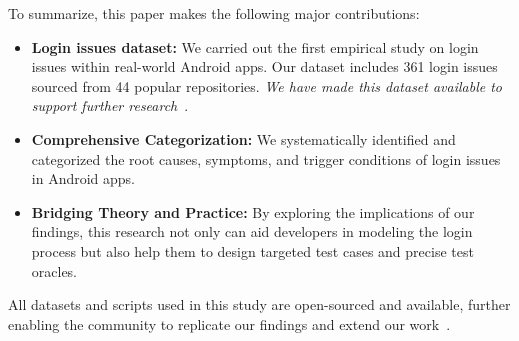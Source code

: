 
 
To summarize, this paper makes the following major contributions:
\begin{itemize}
\item \textbf{Login issues dataset:} We carried out the first empirical study on login issues within real-world Android apps. Our dataset includes 361 login issues sourced from 44 popular repositories. \textit{We have made this dataset available to support further research}~\cite{code}.


\item \textbf{Comprehensive Categorization:} We systematically identified and categorized the root causes, symptoms, and trigger conditions of login issues in Android apps.
\item \textbf{Bridging Theory and Practice:} By exploring the implications of our findings, this research not only can aid developers in modeling the login process but also help them to design targeted test cases and precise test oracles.
\end{itemize}

All datasets and scripts used in this study are open-sourced and available, further enabling the community to replicate our findings and extend our work~\cite{code}.



